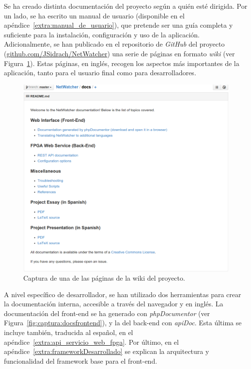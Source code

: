 Se ha creado distinta documentación del proyecto según a quién esté dirigida.
Por un lado, se ha escrito un manual de usuario (disponible en el apéndice~\ref{extra:manual_de_usuario}), que pretende ser una guía completa y suficiente para la instalación, configuración y uso de la aplicación.
Adicionalmente, se han publicado en el repositorio de \textit{GitHub} del proyecto (\url{github.com/JSidrach/NetWatcher}) una serie de páginas en formato \textit{wiki} (ver Figura~\ref{fig:captura:wiki}).
Estas páginas, en inglés, recogen los aspectos más importantes de la aplicación, tanto para el usuario final como para desarrolladores.

\begin{figure}[!htp]
  \centering
  \includegraphics[width=\textwidth,clip=true]{graphics/capturas/github_docs}
  \caption{Captura de una de las páginas de la wiki del proyecto.}
  \label{fig:captura:wiki}
\end{figure}

A nivel específico de desarrollador, se han utilizado dos herramientas para crear la documentación interna, accesible a través del navegador y en inglés.
La documentación del \gls{front-end} se ha generado con \textit{phpDocumentor} (ver Figura~\ref{fig:captura:docsfrontend}), y la del \gls{back-end} con \textit{apiDoc}.
Esta última se incluye también, traducida al español, en el apéndice~\ref{extra:api_servicio_web_fpga}.
Por último, en el apéndice~\ref{extra:frameworkDesarrollado} se explican la arquitectura y funcionalidad del \gls{framework} base para el \gls{front-end}.

